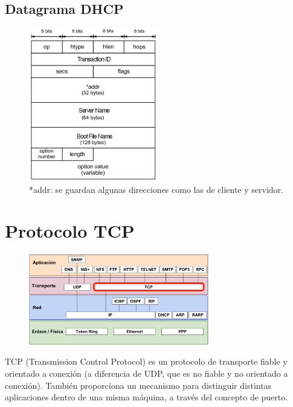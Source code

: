 \subsection{Datagrama DHCP}
\begin{figure}[H]
    \centering
    \includegraphics[width=0.5\textwidth]{img/DHCPformat.jpg}
    \caption{*addr: se guardan algunas direcciones como las de cliente y servidor.}
\end{figure}
\newpage
\section{Protocolo TCP}
\begin{figure}[H]
    \centering
    \includegraphics[width=0.7\textwidth]{img/TCP.png}
\end{figure}
TCP (Transmission Control Protocol) es un protocolo de transporte fiable y orientado a conexión (a diferencia de UDP, que es no fiable y no orientado a conexión). También proporciona un mecanismo para distinguir distintas aplicaciones dentro de una misma máquina, a través del concepto de puerto.

